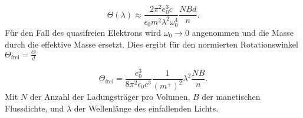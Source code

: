 \begin{equation}
    \Theta (\lambda) \approx \frac{2 \pi^2 e_0^3 c }{\epsilon_0 m^2 \lambda^2 \omega_0^4} \frac{N B d}{n}.
\end{equation}
Für den Fall des quasifreien Elektrons wird $\omega_0 \to 0$ angenommen 
und die Masse durch die effektive Masse ersetzt. 
Dies ergibt für den normierten Rotationswinkel $\Theta_{\text{frei}} = \frac{\Theta}{d}$

\begin{equation}
    \Theta_{\text{frei}} = \frac{e_0^3}{8 \pi^2 \epsilon_0 c^3} \frac{1}{(m^+)^2} \lambda^2 \frac{N B}{n}.
    \label{eq:mass}
\end{equation}
Mit $N$ der Anzahl der Ladungsträger pro Volumen, $B$ der manetischen Flussdichte, 
und $\lambda$ der Wellenlänge des einfallenden Lichts.


